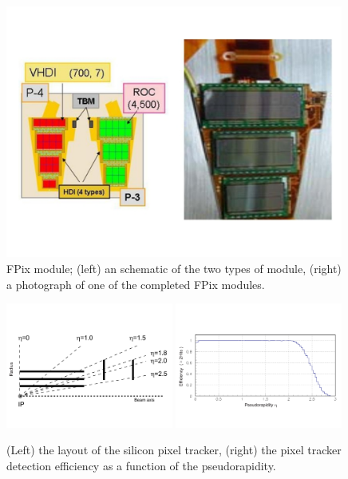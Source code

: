 \begin{figure}
 \centering
\includegraphics[width=0.99\textwidth]{CMS_DetectorFigures/FPixModule.pdf}
 \caption{FPix module; (left) an schematic of the two types of module,
   (right) a photograph of one of the completed FPix modules.\label{fig:Fpix}}
\end{figure}

\begin{figure}
 \centering
\includegraphics[width=0.49\textwidth]{CMS_DetectorFigures/PixelLayout.pdf}
\includegraphics[width=0.49\textwidth]{CMS_DetectorFigures/PixelEfficiency.pdf}
 \caption{(Left) the layout of the silicon pixel tracker, (right) the
   pixel tracker detection efficiency as a function of the pseudorapidity.\label{fig:PixelLayout}}
\end{figure}

